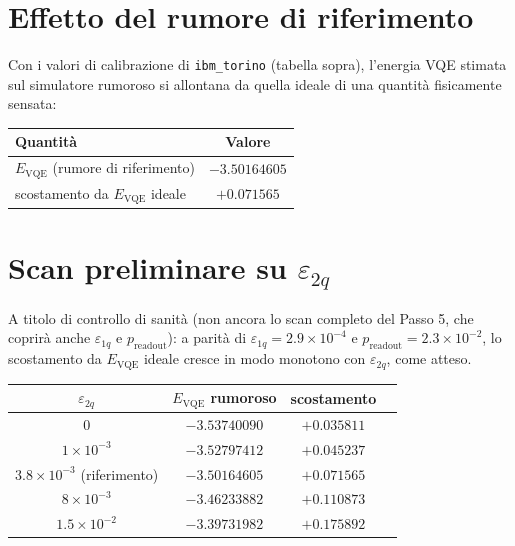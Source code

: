 \documentclass[11pt,a4paper]{article}
\begin{document}
\section*{Effetto del rumore di riferimento}

Con i valori di calibrazione di \texttt{ibm\_torino} (tabella sopra),
l'energia VQE stimata sul simulatore rumoroso si allontana da quella ideale
di una quantità fisicamente sensata:

\begin{center}
\renewcommand{\arraystretch}{1.2}
\begin{tabular}{@{}lc@{}}
\toprule
\textbf{Quantità} & \textbf{Valore}\\
\midrule
$E_\text{VQE}$ (rumore di riferimento) & $-3.50164605$\\
scostamento da $E_\text{VQE}$ ideale & $+0.071565$\\
\bottomrule
\end{tabular}
\end{center}

\section*{Scan preliminare su $\varepsilon_{2q}$}

A titolo di controllo di sanità (non ancora lo scan completo del Passo 5,
che coprirà anche $\varepsilon_{1q}$ e $p_\text{readout}$): a parità di
$\varepsilon_{1q}=2.9\times10^{-4}$ e $p_\text{readout}=2.3\times10^{-2}$,
lo scostamento da $E_\text{VQE}$ ideale cresce in modo monotono con
$\varepsilon_{2q}$, come atteso.

\begin{center}
\renewcommand{\arraystretch}{1.2}
\begin{tabular}{@{}cccc@{}}
\toprule
$\varepsilon_{2q}$ & $E_\text{VQE}$ rumoroso & scostamento \\
\midrule
$0$ & $-3.53740090$ & $+0.035811$ \\
$1\times10^{-3}$ & $-3.52797412$ & $+0.045237$ \\
$3.8\times10^{-3}$ (riferimento) & $-3.50164605$ & $+0.071565$ \\
$8\times10^{-3}$ & $-3.46233882$ & $+0.110873$ \\
$1.5\times10^{-2}$ & $-3.39731982$ & $+0.175892$ \\
\bottomrule
\end{tabular}
\end{center}
\end{document}
